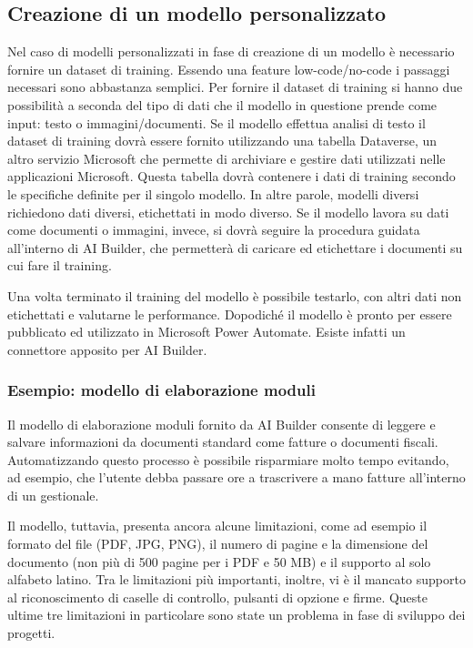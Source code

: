 \subsection{Creazione di un modello personalizzato}
Nel caso di modelli personalizzati in fase di creazione di un modello è necessario fornire un dataset di training. Essendo una feature low-code/no-code i passaggi necessari sono abbastanza semplici. Per fornire il dataset di training si hanno due possibilità a seconda del tipo di dati che il modello in questione prende come input: testo o immagini/documenti. Se il modello effettua analisi di testo il dataset di training dovrà essere fornito utilizzando una tabella Dataverse, un altro servizio Microsoft che permette di archiviare e gestire dati utilizzati nelle applicazioni Microsoft. Questa tabella dovrà contenere i dati di training secondo le specifiche definite per il singolo modello. In altre parole, modelli diversi richiedono dati diversi, etichettati in modo diverso. 
Se il modello lavora su dati come documenti o immagini, invece, si dovrà seguire la procedura guidata all'interno di AI Builder, che permetterà di caricare ed etichettare i documenti su cui fare il training. 

Una volta terminato il training del modello è possibile testarlo, con altri dati non etichettati e valutarne le performance. Dopodiché il modello è pronto per essere pubblicato ed utilizzato in Microsoft Power Automate. Esiste infatti un connettore apposito per AI Builder.

\subsubsection{Esempio: modello di elaborazione moduli}
Il modello di elaborazione moduli fornito da AI Builder consente di leggere e salvare informazioni da documenti standard come fatture o documenti fiscali. Automatizzando questo processo è possibile risparmiare molto tempo evitando, ad esempio, che l'utente debba passare ore a trascrivere a mano fatture all'interno di un gestionale.

Il modello, tuttavia, presenta ancora alcune limitazioni, come ad esempio il formato del file (PDF, JPG, PNG), il numero di pagine  e la dimensione del documento (non più di 500 pagine per i PDF e 50 MB) e il supporto al solo alfabeto latino.
Tra le limitazioni più importanti, inoltre, vi è il mancato supporto al riconoscimento di caselle di controllo, pulsanti di opzione e firme. Queste ultime tre limitazioni in particolare sono state un problema in fase di sviluppo dei progetti.

